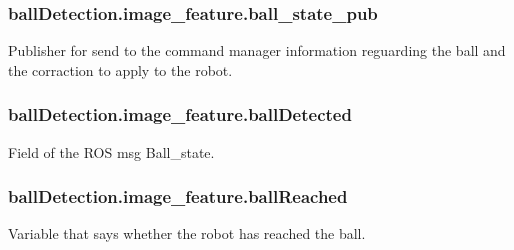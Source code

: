 \subsubsection[{\texorpdfstring{ball\+\_\+state\+\_\+pub}{ball_state_pub}}]{\setlength{\rightskip}{0pt plus 5cm}ball\+Detection.\+image\+\_\+feature.\+ball\+\_\+state\+\_\+pub}\hypertarget{classballDetection_1_1image__feature_a5fa76faf1ca73df49668bbfbd6359ca6}{}\label{classballDetection_1_1image__feature_a5fa76faf1ca73df49668bbfbd6359ca6}


Publisher for send to the command manager information reguarding the ball and the corraction to apply to the robot. 

\subsubsection[{\texorpdfstring{ball\+Detected}{ballDetected}}]{\setlength{\rightskip}{0pt plus 5cm}ball\+Detection.\+image\+\_\+feature.\+ball\+Detected\hspace{0.3cm}{\ttfamily [static]}}\hypertarget{classballDetection_1_1image__feature_a60c51ba153ca9be2cb0231850f9a06bb}{}\label{classballDetection_1_1image__feature_a60c51ba153ca9be2cb0231850f9a06bb}


Field of the R\+OS msg Ball\+\_\+state. 

\subsubsection[{\texorpdfstring{ball\+Reached}{ballReached}}]{\setlength{\rightskip}{0pt plus 5cm}ball\+Detection.\+image\+\_\+feature.\+ball\+Reached\hspace{0.3cm}{\ttfamily [static]}}\hypertarget{classballDetection_1_1image__feature_ae7733d80f1a59b84036b204c44f1d594}{}\label{classballDetection_1_1image__feature_ae7733d80f1a59b84036b204c44f1d594}


Variable that says whether the robot has reached the ball. 

